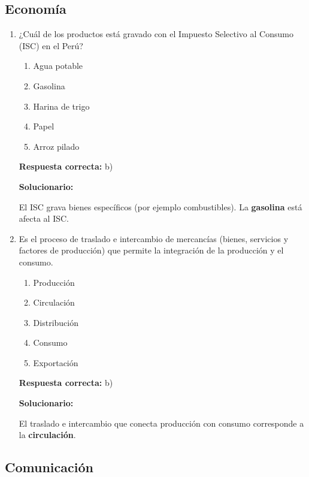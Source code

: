 \subsection*{Economía}

\begin{enumerate}[resume]


\item ¿Cuál de los productos está gravado con el Impuesto Selectivo al Consumo (ISC) en el Perú?
\begin{enumerate}[label=\alph*)]
	\item Agua potable
	\item Gasolina
	\item Harina de trigo
	\item Papel
	\item Arroz pilado
\end{enumerate}

\textbf{Respuesta correcta:} b)

\vspace{2mm}
\textbf{Solucionario:}

El ISC grava bienes específicos (por ejemplo combustibles). La \textbf{gasolina} está afecta al ISC.

\item  Es el proceso de traslado e intercambio de mercancías (bienes, servicios y factores de producción) que permite la integración de la producción y el consumo.
\begin{enumerate}[label=\alph*)]
	\item Producción
	\item Circulación
	\item Distribución
	\item Consumo
	\item Exportación
\end{enumerate}

\textbf{Respuesta correcta:} b)

\vspace{2mm}
\textbf{Solucionario:}

El traslado e intercambio que conecta producción con consumo corresponde a la \textbf{circulación}.


\end{enumerate}


\subsection*{Comunicación}

